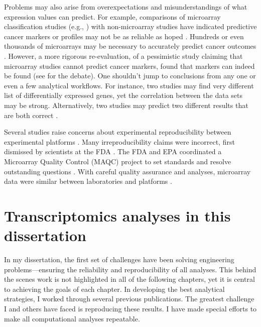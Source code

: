 Problems may also arise from overexpectations and misunderstandings 
of what expression values can predict. 
For example, comparisons of microarray classification
studies (e.g., \cite{Veer:2002vv,Yeoh:2002wg,Alizadeh:2000tn,Golub:1999fn,
Perou:1999fr,Wang:2005uu,VanDeVijver:2002wj,Rosenwald:2002eg,Beer:2002uy,
Bhattacharjee:2001dt,Ramaswamy:2003to,Pomeroy:2002wx,Iizuka:2003wo})
with non-microarray studies have indicated predictive cancer markers or profiles
may not be as reliable as hoped \cite{Miklos:2004wn,Michiels:2007vs,Koscielny:2010gg,Eden:2004ua}.
Hundreds or even thousands of microarrays may be necessary to
accurately predict cancer 
outcomes \cite{Ioannidis:2005kd,Michiels:2005tg,EinDor:2006ga,Frantz:2005ur}.
However, a more rigorous re-evaluation, of a pessimistic study claiming
that microarray studies cannot predict cancer markers, found that
markers can indeed be found (see \cite{Michiels:2005tg,Fan:2010cv,Tong:2010ka,Koscielny:2010jd}
for the debate).
One shouldn't jump to conclusions from any one or even a few
analytical workflows.
For instance, two studies may find very different
list of differentially expressed genes, yet the correlation
between the data sets may be strong. Alternatively, two studies may
predict two different results that are both correct \cite{Zhang:2008bk,Zhang:2009cy}.

Several studies 
raise concerns about experimental reproducibility between
experimental platforms \cite{Tan:2003be,Kuo:2002cl,
Mah:2004ia,Rogojina:2003te,Woo:2004wz,Li:2002cz,Kothapalli:2002gz}.
Many irreproducibility claims were incorrect, first
dismissed by scientists at the FDA \cite{Shi:2005ik}.
The FDA and EPA coordinated a Microarray Quality Control (MAQC) project
to set standards and resolve outstanding questions 
\cite{Lesko:2004vi,Frueh:2006uy,Dix:2006ty,Shi:2004vh}.
With careful quality assurance and analyses,
microarray data were similar between 
laboratories \cite{Dobbin:2005wj,Irizarry:2005kb,Larkin:2005hb,
Ulrich:2004vw,Waring:2004vh,Weis:2005ut} and
platforms \cite{Petersen:2005by,Yauk:2004fq,
Park:2004ux,Yuen:2002ha,Canales:2006ts,Shippy:2006uf,
Patterson:2006hi,Tong:2006cg,Guo:2006wi}.


\section{Transcriptomics analyses in this dissertation}

In my dissertation, the first set of challenges have
been solving engineering problems---ensuring the reliability
and reproducibility of all analyses. This behind the scenes work is not highlighted
in all of the following chapters, yet it is central
to achieving the goals of each chapter.
In developing the best analytical strategies, I worked
through several previous publications. The greatest challenge
I and others have faced is reproducing these results.
I have made special efforts to make all computational
analyses repeatable. 


